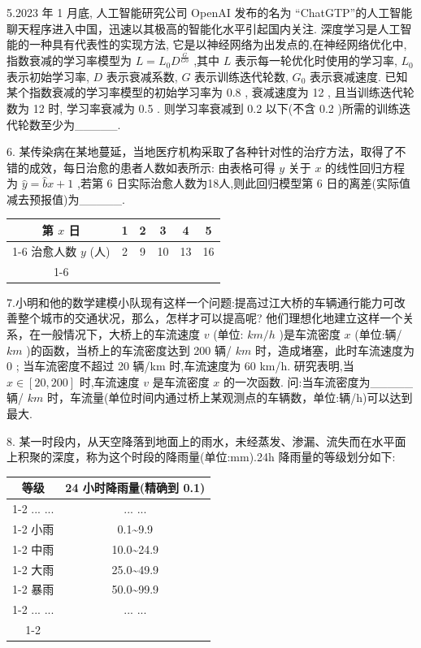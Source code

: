 5.2023 年 1 月底, 人工智能研究公司 OpenAI 发布的名为 “ChatGTP”的人工智能聊天程序进入中国，迅速以其极高的智能化水平引起国内关注. 深度学习是人工智能的一种具有代表性的实现方法, 它是以神经网络为出发点的,在神经网络优化中,指数衰减的学习率模型为 $L = {L}_{0}{D}^{\frac{G}{G0}}$ ,其中 $L$ 表示每一轮优化时使用的学习率, ${L}_{0}$ 表示初始学习率, $D$ 表示衰减系数, $G$ 表示训练迭代轮数, ${G}_{0}$ 表示衰减速度. 已知某个指数衰减的学习率模型的初始学习率为 0.8 , 衰减速度为 12 , 且当训练迭代轮数为 12 时, 学习率衰减为 0.5 . 则学习率衰减到 0.2 以下(不含 0.2 )所需的训练迭代轮数至少为\_\_\_\_\_.

6. 某传染病在某地蔓延，当地医疗机构采取了各种针对性的治疗方法，取得了不错的成效，每日治愈的患者人数如表所示: 由表格可得 $y$ 关于 $x$ 的线性回归方程为 $\widehat{y} = \widehat{b}x + 1$ ,若第 6 日实际治愈人数为18人,则此回归模型第 6 日的离差(实际值减去预报值)为\_\_\_\_\_.

\begin{center}
\begin{tabular}{|c|c|c|c|c|c|}
\hline
第 $x$ 日 & 1 & 2 & 3 & 4 & 5 \\
\cline{1-6}
治愈人数 $y$ (人) & 2 & 9 & 10 & 13 & 16 \\
\cline{1-6}
\hline
\end{tabular}
\end{center}

7.小明和他的数学建模小队现有这样一个问题:提高过江大桥的车辆通行能力可改善整个城市的交通状况，那么，怎样才可以提高呢? 他们理想化地建立这样一个关系，在一般情况下，大桥上的车流速度 $v$ (单位: ${k}{m}/{h}$ )是车流密度 $x$ (单位:辆/ ${{km}}$ )的函数，当桥上的车流密度达到 200 辆/ ${{km}}$ 时，造成堵塞，此时车流速度为 0 ; 当车流密度不超过 20 辆/km 时,车流速度为 60 km/h. 研究表明,当 $x \in  \left\lbrack  {{20},{200}}\right\rbrack$ 时,车流速度 $v$ 是车流密度 $x$ 的一次函数. 问:当车流密度为\_\_\_\_\_辆/ ${{km}}$ 时，车流量(单位时间内通过桥上某观测点的车辆数，单位:辆/h)可以达到最大.

8. 某一时段内，从天空降落到地面上的雨水，未经蒸发、渗漏、流失而在水平面上积聚的深度，称为这个时段的降雨量(单位:mm).24h 降雨量的等级划分如下:

\begin{center}
\begin{tabular}{|c|c|}
\hline
等级 & 24 小时降雨量(精确到 0.1) \\
\cline{1-2}
... ... & ... ... \\
\cline{1-2}
小雨 & 0.1\textasciitilde 9.9 \\
\cline{1-2}
中雨 & 10.0\textasciitilde 24.9 \\
\cline{1-2}
大雨 & 25.0\textasciitilde 49.9 \\
\cline{1-2}
暴雨 & 50.0\textasciitilde 99.9 \\
\cline{1-2}
... ... & ... ... \\
\cline{1-2}
\hline
\end{tabular}
\end{center}

